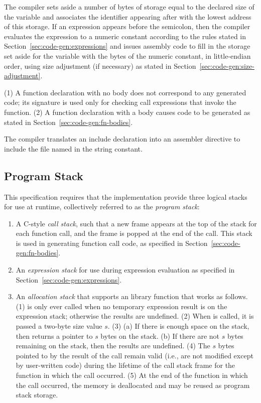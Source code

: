 \documentclass[10pt]{article}
\begin{document}
 The compiler sets aside a
number of bytes of storage equal to the declared size of the variable
and associates the identifier appearing after  with the
lowest address of this storage.  If an expression appears before the
semicolon, then the compiler evaluates the expression to a numeric
constant according to the rules stated in
Section~\ref{sec:code-gen:expressions} and issues assembly code to
fill in the storage set aside for the variable with the bytes of the
numeric constant, in little-endian order, using size adjustment (if
necessary) as stated in Section~\ref{sec:code-gen:size-adjustment}.

 (1) A function declaration with no
body does not correspond to any generated code; its signature is used
only for checking call expressions that invoke the function.  (2) A
function declaration with a body causes code to be generated as stated
in Section~\ref{sec:code-gen:fn-bodies}.

  The compiler translates an include
declaration into an assembler directive to include the file named in
the string constant.

\subsection{Program Stack}
\label{sec:code-gen:program-stack}

This specification requires that the implementation provide three
logical stacks for use at runtime, collectively referred to as the
\emph{program stack}:
%
\begin{enumerate}
%
\item A C-style \emph{call stack}, such that a new frame appears at
  the top of the stack for each function call, and the frame is popped
  at the end of the call.  This stack is used in generating function
  call code, as specified in Section~\ref{sec:code-gen:fn-bodies}.
%
\item An \emph{expression stack} for use during expression evaluation
  as specified in Section~\ref{sec:code-gen:expressions}.
%
\item An \emph{allocation stack} that supports an 
  library function that works as follows.  (1)  is only
  ever called when no temporary expression result is on the expression
  stack; otherwise the results are undefined.  (2) When 
  is called, it is passed a two-byte size value $s$.  (3) (a) If there
  is enough space on the stack, then  returns a pointer
  to $s$ bytes on the stack. (b) If there are not $s$ bytes remaining
  on the stack, then the results are undefined. (4) The $s$ bytes
  pointed to by the result of the  call remain valid
  (i.e., are not modified except by user-written code) during the
  lifetime of the call stack frame for the function in which the
   call occurred.  (5) At the end of the function in
  which the  call occurred, the memory is deallocated
  and may be reused as program stack storage.
%
\end{enumerate}
\end{document}
